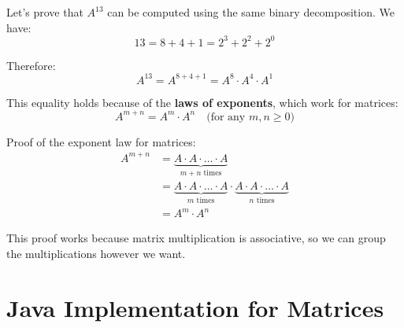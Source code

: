 \documentclass{article}
\begin{document}
	Let's prove that $A^{13}$ can be computed using the same binary decomposition. We have:
	\[
	13 = 8 + 4 + 1 = 2^3 + 2^2 + 2^0
	\]
	
	Therefore:
	\[
	A^{13} = A^{8+4+1} = A^8 \cdot A^4 \cdot A^1
	\]
	
	This equality holds because of the \textbf{laws of exponents}, which work for matrices:
	\[
	A^{m+n} = A^m \cdot A^n \quad \text{(for any } m, n \geq 0\text{)}
	\]
	
	Proof of the exponent law for matrices:
	\begin{align*}
		A^{m+n} &= \underbrace{A \cdot A \cdot \ldots \cdot A}_{m+n \text{ times}} \\
		&= \underbrace{A \cdot A \cdot \ldots \cdot A}_{m \text{ times}} \cdot \underbrace{A \cdot A \cdot \ldots \cdot A}_{n \text{ times}} \\
		&= A^m \cdot A^n
	\end{align*}
	
	This proof works because matrix multiplication is associative, so we can group the multiplications however we want.
		
	\section{Java Implementation for Matrices}
	
\end{document}
